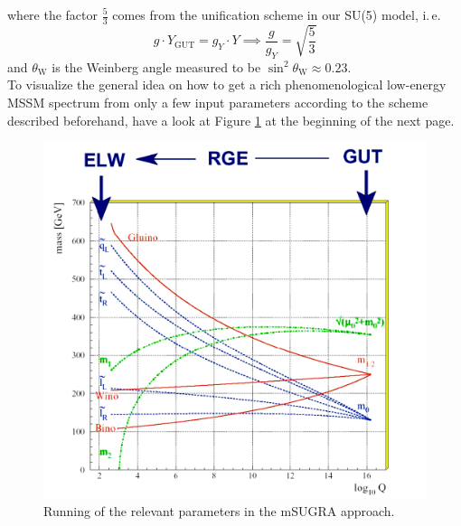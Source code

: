 where the factor $\frac{5}{3}$ comes from the unification scheme in our SU(5) model, i.\,e.
\begin{equation}
	g\cdot Y_{\mathrm{GUT}} = g_Y\cdot Y \implies \frac{g}{g_Y} = \sqrt{\frac{5}{3}} 
\end{equation}
and $\theta_{\mathrm{W}}$ is the Weinberg angle measured to be $\sin^2 \theta_{\mathrm{W}} \approx 0.23$.\\
To visualize the general idea on how to get a rich phenomenological low-energy MSSM spectrum from only a few input parameters according to the scheme described beforehand, have a look at Figure \ref{fig:rge} at the beginning of the next page.\newpage
\begin{figure}[t]
\centering
\includegraphics[scale = 0.8]{figures/mSUGRA_RGE}
\caption[Running of the relevant parameters in the mSUGRA approach.]{Running of the relevant parameters in the mSUGRA approach\footnotemark.}
\label{fig:rge}
\end{figure}

